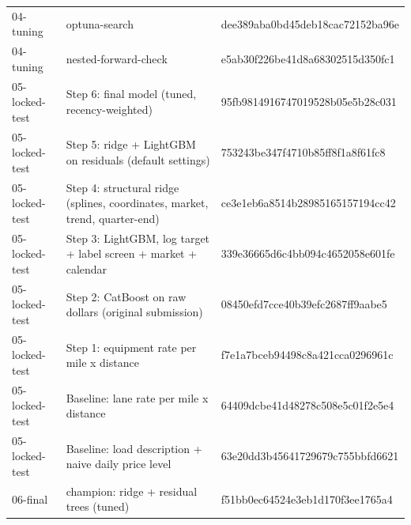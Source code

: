 \begin{tabular}{lll}
04-tuning & optuna-search & dee389aba0bd45deb18cac72152ba96e \\
04-tuning & nested-forward-check & e5ab30f226be41d8a68302515d350fc1 \\
05-locked-test & Step 6: final model (tuned, recency-weighted) & 95fb9814916747019528b05e5b28c031 \\
05-locked-test & Step 5: ridge + LightGBM on residuals (default settings) & 753243be347f4710b85ff8f1a8f61fc8 \\
05-locked-test & Step 4: structural ridge (splines, coordinates, market, trend, quarter-end) & ce3e1eb6a8514b28985165157194cc42 \\
05-locked-test & Step 3: LightGBM, log target + label screen + market + calendar & 339e36665d6c4bb094c4652058e601fe \\
05-locked-test & Step 2: CatBoost on raw dollars (original submission) & 08450efd7cce40b39efc2687ff9aabe5 \\
05-locked-test & Step 1: equipment rate per mile x distance & f7e1a7bceb94498c8a421cca0296961c \\
05-locked-test & Baseline: lane rate per mile x distance & 64409dcbe41d48278c508e5c01f2e5e4 \\
05-locked-test & Baseline: load description + naive daily price level & 63e20dd3b45641729679c755bbfd6621 \\
06-final & champion: ridge + residual trees (tuned) & f51bb0ec64524e3eb1d170f3ee1765a4 \\
\bottomrule
\end{tabular}

